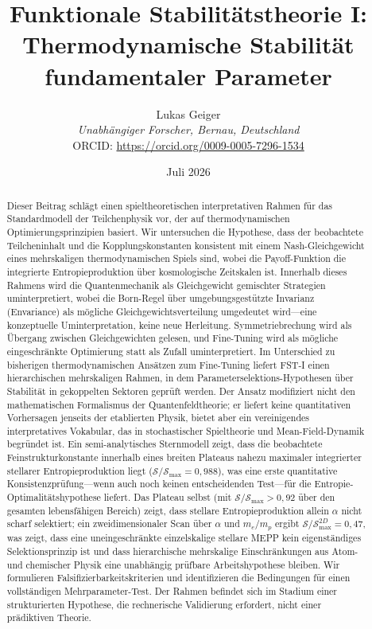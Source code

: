 \documentclass[12pt,a4paper]{article}
\title{Funktionale Stabilitätstheorie I: Thermodynamische Stabilität fundamentaler Parameter}
\author{Lukas Geiger\\
\textit{Unabh\"angiger Forscher, Bernau, Deutschland}\\
ORCID: \url{https://orcid.org/0009-0005-7296-1534}}
\date{Juli 2026}
\theoremstyle{remark}
\begin{document}
\maketitle

\begin{abstract}
Dieser Beitrag schl\"agt einen spieltheoretischen interpretativen Rahmen f\"ur das Standardmodell der Teilchenphysik vor, der auf thermodynamischen Optimierungsprinzipien basiert. Wir untersuchen die Hypothese, dass der beobachtete Teilcheninhalt und die Kopplungskonstanten konsistent mit einem Nash-Gleichgewicht eines mehrskaligen thermodynamischen Spiels sind, wobei die Payoff-Funktion die integrierte Entropieproduktion \"uber kosmologische Zeitskalen ist. Innerhalb dieses Rahmens wird die Quantenmechanik als Gleichgewicht gemischter Strategien uminterpretiert, wobei die Born-Regel \"uber umgebungsgest\"utzte Invarianz (Envariance) als m\"ogliche Gleichgewichtsverteilung umgedeutet wird---eine konzeptuelle Uminterpretation, keine neue Herleitung. Symmetriebrechung wird als \"Ubergang zwischen Gleichgewichten gelesen, und Fine-Tuning wird als m\"ogliche eingeschr\"ankte Optimierung statt als Zufall uminterpretiert. Im Unterschied zu bisherigen thermodynamischen Ans\"atzen zum Fine-Tuning liefert FST-I einen hierarchischen mehrskaligen Rahmen, in dem Parameterselektions-Hypothesen \"uber Stabilit\"at in gekoppelten Sektoren gepr\"uft werden. Der Ansatz modifiziert nicht den mathematischen Formalismus der Quantenfeldtheorie; er liefert keine quantitativen Vorhersagen jenseits der etablierten Physik, bietet aber ein vereinigendes interpretatives Vokabular, das in stochastischer Spieltheorie und Mean-Field-Dynamik begr\"undet ist. Ein semi-analytisches Sternmodell zeigt, dass die beobachtete Feinstrukturkonstante innerhalb eines breiten Plateaus nahezu maximaler integrierter stellarer Entropieproduktion liegt ($\mathcal{S}/\mathcal{S}_{\max} = 0{,}988$), was eine erste quantitative Konsistenzpr\"ufung---wenn auch noch keinen entscheidenden Test---f\"ur die Entropie-Optimalit\"atshypothese liefert. Das Plateau selbst (mit $\mathcal{S}/\mathcal{S}_{\max} > 0{,}92$ \"uber den gesamten lebensfähigen Bereich) zeigt, dass stellare Entropieproduktion allein $\alpha$ nicht scharf selektiert; ein zweidimensionaler Scan \"uber $\alpha$ und $m_e/m_p$ ergibt $\mathcal{S}/\mathcal{S}_{\max}^{2D} = 0{,}47$, was zeigt, dass eine uneingeschr\"ankte einzelskalige stellare MEPP kein eigenst\"andiges Selektionsprinzip ist und dass hierarchische mehrskalige Einschr\"ankungen aus Atom- und chemischer Physik eine unabh\"angig pr\"ufbare Arbeitshypothese bleiben. Wir formulieren Falsifizierbarkeitskriterien und identifizieren die Bedingungen f\"ur einen vollst\"andigen Mehrparameter-Test. Der Rahmen befindet sich im Stadium einer strukturierten Hypothese, die rechnerische Validierung erfordert, nicht einer pr\"adiktiven Theorie.
\end{abstract}
\end{document}
